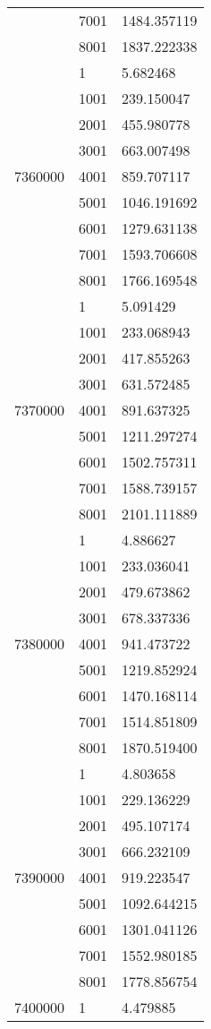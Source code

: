 \begin{table}[htb!]
\begin{tabular}{lll}
 & 7001 & 1484.357119 \\
 & 8001 & 1837.222338 \\
\multirow[c]{9}{*}{7360000} & 1 & 5.682468 \\
 & 1001 & 239.150047 \\
 & 2001 & 455.980778 \\
 & 3001 & 663.007498 \\
 & 4001 & 859.707117 \\
 & 5001 & 1046.191692 \\
 & 6001 & 1279.631138 \\
 & 7001 & 1593.706608 \\
 & 8001 & 1766.169548 \\
\multirow[c]{9}{*}{7370000} & 1 & 5.091429 \\
 & 1001 & 233.068943 \\
 & 2001 & 417.855263 \\
 & 3001 & 631.572485 \\
 & 4001 & 891.637325 \\
 & 5001 & 1211.297274 \\
 & 6001 & 1502.757311 \\
 & 7001 & 1588.739157 \\
 & 8001 & 2101.111889 \\
\multirow[c]{9}{*}{7380000} & 1 & 4.886627 \\
 & 1001 & 233.036041 \\
 & 2001 & 479.673862 \\
 & 3001 & 678.337336 \\
 & 4001 & 941.473722 \\
 & 5001 & 1219.852924 \\
 & 6001 & 1470.168114 \\
 & 7001 & 1514.851809 \\
 & 8001 & 1870.519400 \\
\multirow[c]{9}{*}{7390000} & 1 & 4.803658 \\
 & 1001 & 229.136229 \\
 & 2001 & 495.107174 \\
 & 3001 & 666.232109 \\
 & 4001 & 919.223547 \\
 & 5001 & 1092.644215 \\
 & 6001 & 1301.041126 \\
 & 7001 & 1552.980185 \\
 & 8001 & 1778.856754 \\
\multirow[c]{9}{*}{7400000} & 1 & 4.479885 \\

\end{tabular}
\end{table}
